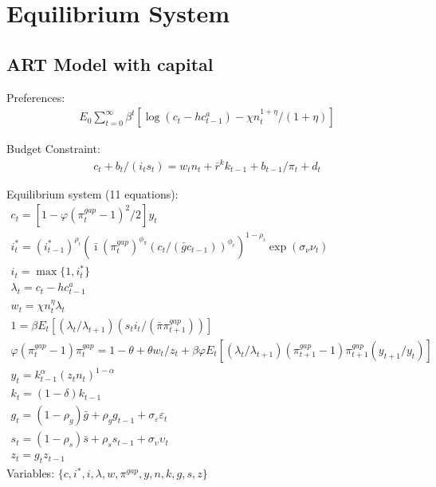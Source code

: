 \documentclass[12pt, final]{article}
\begin{document}
\section{Equilibrium System}

\subsection{ART Model with capital}
\noindent Preferences:
\begin{gather*}
  E_0\textstyle\sum_{t=0}^\infty\beta^t [\log(c_t-hc^a_{t-1})-\chi n_t^{1+\eta}/(1+\eta)]
\end{gather*}

\noindent Budget Constraint:
\begin{gather*}
  c_t+b_t/(i_ts_t)=w_tn_t+\bar{r}^kk_{t-1}+b_{t-1}/\pi_t+d_t%
\end{gather*}

\setcounter{equation}{0}
\noindent Equilibrium system (11 equations):
\small\begin{gather}
c_t = [1-\varphi(\pi_t^{gap}-1)^2/2]y_t\\
i_t^*=(i^*_{t-1})^{\rho_i}(\bar{\imath}(\pi^{gap}_t)^{\phi_\pi}(c_t/(\bar{g}c_{t-1}))^{\phi_c})^{1-\rho_i}\exp(\sigma_\nu\nu_t)\\
i_t=\max\{1,i_t^*\}\\
\lambda_t = c_t - hc^a_{t-1} \\
w_t = \chi n_t^\eta \lambda_t\\
1 =  \beta E_t[(\lambda_t/\lambda_{t+1})(s_ti_t/(\bar{\pi}\pi_{t+1}^{gap}))]\\
\varphi(\pi_t^{gap}-1)\pi_t^{gap} = 1-\theta + \theta w_t/z_t + \beta\varphi E_t[(\lambda_t/\lambda_{t+1})(\pi_{t+1}^{gap}-1)\pi_{t+1}^{gap}(y_{t+1}/y_t)]\\
y_t=k_{t-1}^\alpha(z_t n_t)^{1-\alpha}\\ %
k_t = (1-\delta)k_{t-1} \\%
  g_t= (1-\rho_g)\bar{g}+\rho_gg_{t-1} + \sigma_\varepsilon\varepsilon_t \\
  s_t=(1-\rho_s)\bar{s}+\rho_ss_{t-1} + \sigma_\upsilon\upsilon_t\\
  z_t=g_tz_{t-1}
\end{gather}\normalsize
Variables: $\{c,i^*,i,\lambda,w,\pi^{gap},y,n,k,g,s,z\}$\\
\end{document}
